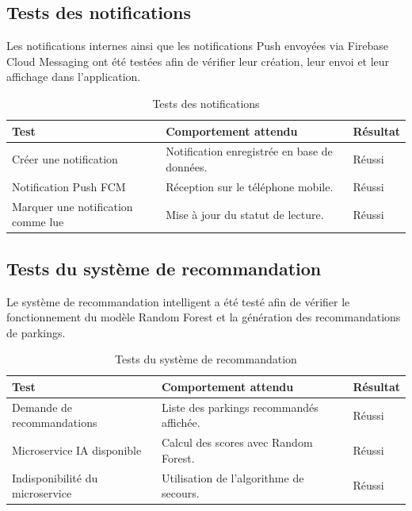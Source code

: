\subsection{Tests des notifications}

\par Les notifications internes ainsi que les notifications Push envoyées via Firebase Cloud Messaging ont été testées afin de vérifier leur création, leur envoi et leur affichage dans l'application.

\begin{table}[H]
\centering
\small
\renewcommand{\arraystretch}{1.25}
\begin{tabular}{|p{}|p{}|p{}|}
\hline
\textbf{Test} & \textbf{Comportement attendu} & \textbf{Résultat} \\
\hline
Créer une notification & Notification enregistrée en base de données. & Réussi \\
\hline
Notification Push FCM & Réception sur le téléphone mobile. & Réussi \\
\hline
Marquer une notification comme lue & Mise à jour du statut de lecture. & Réussi \\
\hline
\end{tabular}
\caption{Tests des notifications}
\label{tab:notification_tests}
\end{table}

\subsection{Tests du système de recommandation}

\par Le système de recommandation intelligent a été testé afin de vérifier le fonctionnement du modèle Random Forest et la génération des recommandations de parkings.

\begin{table}[H]
\centering
\small
\renewcommand{\arraystretch}{1.25}
\begin{tabular}{|p{}|p{}|p{}|}
\hline
\textbf{Test} & \textbf{Comportement attendu} & \textbf{Résultat} \\
\hline
Demande de recommandations & Liste des parkings recommandés affichée. & Réussi \\
\hline
Microservice IA disponible & Calcul des scores avec Random Forest. & Réussi \\
\hline
Indisponibilité du microservice & Utilisation de l'algorithme de secours. & Réussi \\
\hline
\end{tabular}
\caption{Tests du système de recommandation}
\label{tab:ai_tests}
\end{table}



